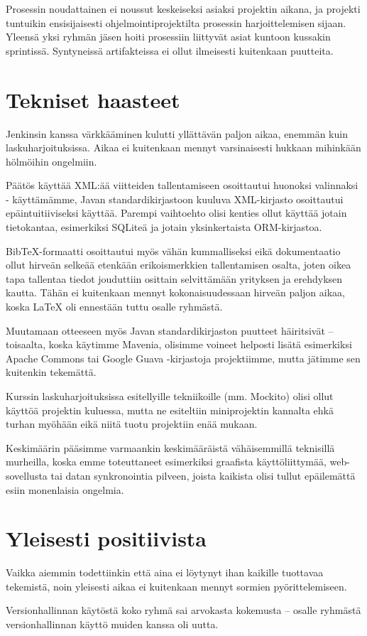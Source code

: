\documentclass{article}
\begin{document}
Prosessin noudattainen ei noussut keskeiseksi asiaksi projektin aikana, ja projekti tuntuikin ensisijaisesti ohjelmointiprojektilta prosessin harjoittelemisen sijaan. Yleensä yksi ryhmän jäsen hoiti prosessiin liittyvät asiat kuntoon kussakin sprintissä. Syntyneissä artifakteissa ei ollut ilmeisesti kuitenkaan puutteita.

\section{Tekniset haasteet}

Jenkinsin kanssa värkkääminen kulutti yllättävän paljon aikaa, enemmän kuin laskuharjoituksissa. Aikaa ei kuitenkaan mennyt varsinaisesti hukkaan mihinkään hölmöihin ongelmiin.

Päätös käyttää XML:ää viitteiden tallentamiseen osoittautui huonoksi valinnaksi - käyttämämme, Javan standardikirjastoon kuuluva XML-kirjasto osoittautui epäintuitiiviseksi käyttää. Parempi vaihtoehto olisi kenties ollut käyttää jotain tietokantaa, esimerkiksi SQLiteä ja jotain yksinkertaista ORM-kirjastoa.

BibTeX-formaatti osoittautui myös vähän kummalliseksi eikä dokumentaatio ollut hirveän selkeää etenkään erikoismerkkien tallentamisen osalta, joten oikea tapa tallentaa tiedot jouduttiin osittain selvittämään yrityksen ja erehdyksen kautta. Tähän ei kuitenkaan mennyt kokonaisuudessaan hirveän paljon aikaa, koska LaTeX oli ennestään tuttu osalle ryhmästä.

Muutamaan otteeseen myös Javan standardikirjaston puutteet häiritsivät -- toisaalta, koska käytimme Mavenia, olisimme voineet helposti lisätä esimerkiksi Apache Commons tai Google Guava -kirjastoja projektiimme, mutta jätimme sen kuitenkin tekemättä.

Kurssin laskuharjoituksissa esitellyille tekniikoille (mm. Mockito) olisi ollut käyttöä projektin kuluessa, mutta ne esiteltiin miniprojektin kannalta ehkä turhan myöhään eikä niitä tuotu projektiin enää mukaan.

Keskimäärin pääsimme varmaankin keskimääräistä vähäisemmillä teknisillä murheilla, koska emme toteuttaneet esimerkiksi graafista käyttöliittymää, web-sovellusta tai datan synkronointia pilveen, joista kaikista olisi tullut epäilemättä esiin monenlaisia ongelmia.

\section{Yleisesti positiivista}

Vaikka aiemmin todettiinkin että aina ei löytynyt ihan kaikille tuottavaa tekemistä, noin yleisesti aikaa ei kuitenkaan mennyt sormien pyörittelemiseen.

Versionhallinnan käytöstä koko ryhmä sai arvokasta kokemusta -- osalle ryhmästä versionhallinnan käyttö muiden kanssa oli uutta.
\end{document}
